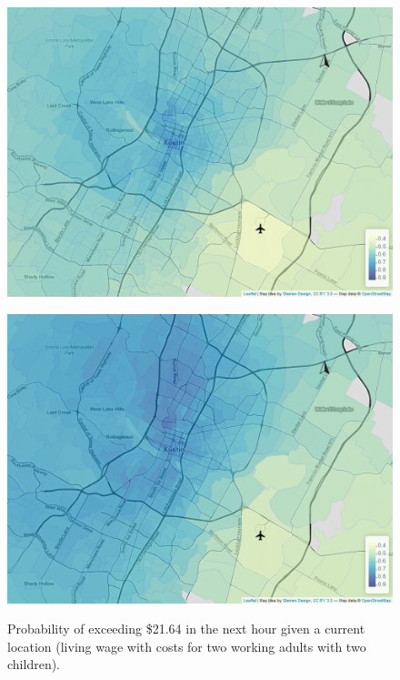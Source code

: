 \documentclass[a4paper, 11pt]{article}
\begin{document}
\begin{figure}[tb]
\begin{minipage}[tb]{0.48\linewidth}
        \label{fig:wages:b}
    \end{minipage}\hfill
    \begin{minipage}[tb]{.48\linewidth}
        \centering
        \includegraphics[width=\linewidth]{img/tailprob_21_64__142.png}
        \label{fig:wages:c}
    \end{minipage}
    \begin{minipage}[tb]{0.48\linewidth}
        \centering
        \includegraphics[width=\linewidth]{img/tailprob_21_64__168.png}
        \label{fig:wages:d}
    \end{minipage}
    \caption{Probability of exceeding \$21.64 in the next hour given a current location (living wage with costs for two working adults with two children).}
    \label{fig:wages}
\end{figure}
\end{document}

